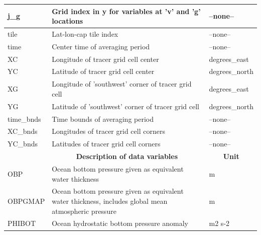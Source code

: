 \begin{longtable}{|m{}|m{}|m{}|}
j\_g &Grid index in y for variables at 'v' and 'g' locations &--none--  \\ \hline
tile &Lat-lon-cap tile index &--none--  \\ \hline
time &Center time of averaging period &--none--  \\ \hline
XC &Longitude of tracer grid cell center &degrees\_east  \\ \hline
YC &Latitude of tracer grid cell center &degrees\_north  \\ \hline
XG &Longitude of 'southwest' corner of tracer grid cell &degrees\_east  \\ \hline
YG &Latitude of 'southwest' corner of tracer grid cell &degrees\_north  \\ \hline
time\_bnds &Time bounds of averaging period &--none--  \\ \hline
XC\_bnds &Longitudes of tracer grid cell corners &--none--  \\ \hline
YC\_bnds &Latitudes of tracer grid cell corners &--none--  \\ \hline
\rowcolor{lightgray} \multicolumn{1}{|c|}{\textbf{Variables}} & \multicolumn{1}{|c|}{\textbf{Description of data variables}} &  \multicolumn{1}{|c|}{\textbf{Unit}}\\ \hline
OBP &Ocean bottom pressure given as equivalent water thickness &m  \\ \hline
OBPGMAP &Ocean bottom pressure given as equivalent water thickness, includes global mean atmospheric pressure &m  \\ \hline
PHIBOT &Ocean hydrostatic bottom pressure anomaly &m2 s-2  \\ \hline
\end{longtable}

\newp
\pagebreak
